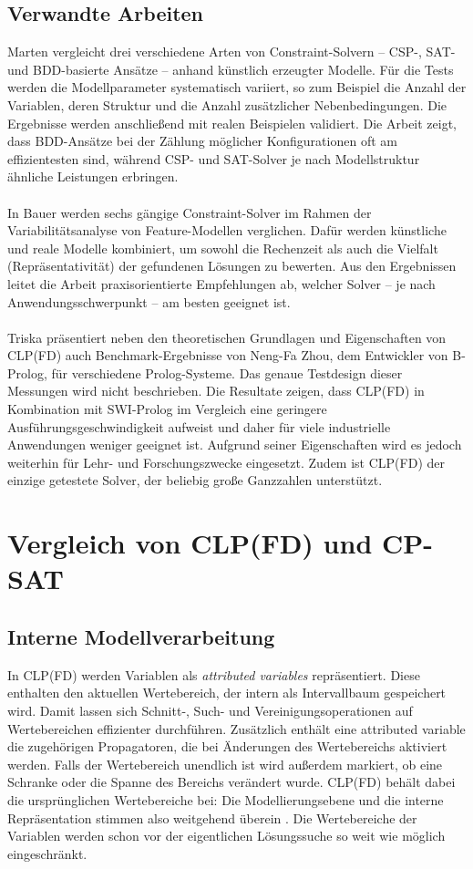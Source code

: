 \documentclass[12pt,a4paper]{article}
\begin{document}
\subsection{Verwandte Arbeiten}
Marten \cite{marten2018} vergleicht drei verschiedene Arten von Constraint-Solvern – CSP-, SAT- und BDD-basierte Ansätze – anhand künstlich erzeugter Modelle.
Für die Tests werden die Modellparameter systematisch variiert, so zum Beispiel die Anzahl der Variablen, deren Struktur und die Anzahl zusätzlicher Nebenbedingungen.
Die Ergebnisse werden anschließend mit realen Beispielen validiert.
Die Arbeit zeigt, dass BDD-Ansätze bei der Zählung möglicher Konfigurationen oft am effizientesten sind, während CSP- und SAT-Solver je nach Modellstruktur ähnliche Leistungen erbringen.\\
\\
In Bauer \cite{bauer2019} werden sechs gängige Constraint-Solver im Rahmen der Variabilitätsanalyse von Feature-Modellen verglichen.
Dafür werden künstliche und reale Modelle kombiniert, um sowohl die Rechenzeit als auch die Vielfalt (Repräsentativität) der gefundenen Lösungen zu bewerten.
Aus den Ergebnissen leitet die Arbeit praxisorientierte Empfehlungen ab, welcher Solver – je nach Anwendungsschwerpunkt – am besten geeignet ist.\\
\\
Triska \cite{drt} präsentiert neben den theoretischen Grundlagen und Eigenschaften von CLP(FD) auch Benchmark-Ergebnisse von Neng-Fa Zhou, dem Entwickler von B-Prolog, für verschiedene Prolog-Systeme.
Das genaue Testdesign dieser Messungen wird nicht beschrieben.
Die Resultate zeigen, dass CLP(FD) in Kombination mit SWI-Prolog im Vergleich eine geringere Ausführungsgeschwindigkeit aufweist und daher für viele industrielle Anwendungen weniger geeignet ist.
Aufgrund seiner Eigenschaften wird es jedoch weiterhin für Lehr- und Forschungszwecke eingesetzt.
Zudem ist CLP(FD) der einzige getestete Solver, der beliebig große Ganzzahlen unterstützt. 
\section{Vergleich von CLP(FD) und CP-SAT}
\subsection{Interne Modellverarbeitung}
In CLP(FD) werden Variablen als \emph{attributed variables} repräsentiert. 
Diese enthalten den aktuellen Wertebereich, der intern als Intervallbaum gespeichert wird. 
Damit lassen sich Schnitt-, Such- und Vereinigungsoperationen auf Wertebereichen effizienter durchführen. 
Zusätzlich enthält eine attributed variable die zugehörigen Propagatoren, die bei Änderungen des Wertebereichs aktiviert werden. 
Falls der Wertebereich unendlich ist wird außerdem markiert, ob eine Schranke oder die Spanne des Bereichs verändert wurde.
CLP(FD) behält dabei die ursprünglichen Wertebereiche bei: Die Modellierungsebene und die interne Repräsentation stimmen also weitgehend überein \cite{drt}.
Die Wertebereiche der Variablen werden schon vor der eigentlichen Lösungssuche so weit wie möglich eingeschränkt.
\end{document}
